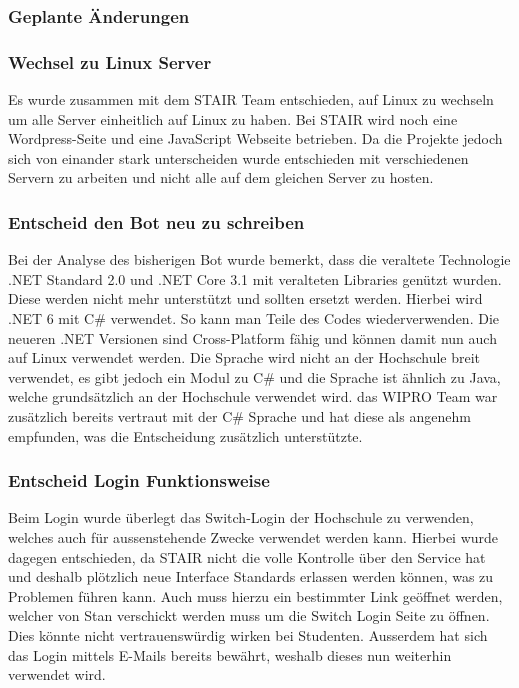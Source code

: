 \documentclass[a4paper, table]{article}
\begin{document}
\subsubsection{Geplante Änderungen}

\subsubsection*{Wechsel zu Linux Server}

Es wurde zusammen mit dem STAIR Team entschieden,
auf Linux zu wechseln um alle Server einheitlich auf Linux zu haben.
Bei STAIR wird noch eine Wordpress-Seite und eine JavaScript Webseite betrieben.
Da die Projekte jedoch sich von einander stark unterscheiden wurde entschieden mit verschiedenen Servern zu arbeiten und nicht alle auf dem gleichen Server zu hosten.

\subsubsection*{Entscheid den Bot neu zu schreiben}

Bei der Analyse des bisherigen Bot wurde bemerkt, dass die veraltete Technologie .NET Standard 2.0 und .NET Core 3.1 mit veralteten Libraries genützt wurden.
Diese werden nicht mehr unterstützt und sollten ersetzt werden.
Hierbei wird .NET 6 mit C\# verwendet.
So kann man Teile des Codes wiederverwenden.
Die neueren .NET Versionen sind Cross-Platform fähig und können damit nun auch auf Linux verwendet werden.\autocite{de_george_installieren_nodate}
Die Sprache wird nicht an der Hochschule breit verwendet, es gibt jedoch ein Modul zu C\#\autocite{}  und die Sprache ist ähnlich zu Java,
welche grundsätzlich an der Hochschule verwendet wird. 
das WIPRO Team war zusätzlich bereits vertraut mit der C\# Sprache und hat diese als angenehm empfunden, was die Entscheidung zusätzlich unterstützte.

\subsubsection*{Entscheid Login Funktionsweise}
Beim Login wurde überlegt das Switch-Login der Hochschule zu verwenden, welches auch für aussenstehende Zwecke verwendet werden kann.
Hierbei wurde dagegen entschieden, da STAIR nicht die volle Kontrolle über den Service hat und deshalb plötzlich neue Interface Standards erlassen werden können, was zu Problemen führen kann.
Auch muss hierzu ein bestimmter Link geöffnet werden, welcher von Stan verschickt werden muss um die Switch Login Seite zu öffnen.
Dies könnte nicht vertrauenswürdig wirken bei Studenten.
Ausserdem hat sich das Login mittels E-Mails bereits bewährt, weshalb dieses nun weiterhin verwendet wird.
\end{document}
